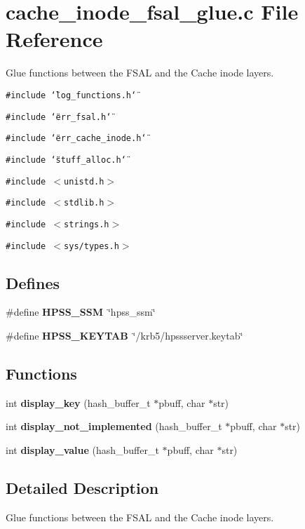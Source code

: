 \section{cache\_\-inode\_\-fsal\_\-glue.c File Reference}
\label{cache__inode__fsal__glue_8c}
Glue functions between the FSAL and the Cache inode layers. 

{\tt \#include \char`\"{}log\_\-functions.h\char`\"{}}\par
{\tt \#include \char`\"{}err\_\-fsal.h\char`\"{}}\par
{\tt \#include \char`\"{}err\_\-cache\_\-inode.h\char`\"{}}\par
{\tt \#include \char`\"{}stuff\_\-alloc.h\char`\"{}}\par
{\tt \#include $<$unistd.h$>$}\par
{\tt \#include $<$stdlib.h$>$}\par
{\tt \#include $<$strings.h$>$}\par
{\tt \#include $<$sys/types.h$>$}\par
\subsection*{Defines}
\begin{CompactItemize}
\item 
\#define {\bf HPSS\_\-SSM}\ \char`\"{}hpss\_\-ssm\char`\"{}
\item 
\#define {\bf HPSS\_\-KEYTAB}\ \char`\"{}/krb5/hpssserver.keytab\char`\"{}
\end{CompactItemize}
\subsection*{Functions}
\begin{CompactItemize}
\item 
int {\bf display\_\-key} (hash\_\-buffer\_\-t $\ast$pbuff, char $\ast$str)
\item 
int {\bf display\_\-not\_\-implemented} (hash\_\-buffer\_\-t $\ast$pbuff, char $\ast$str)
\item 
int {\bf display\_\-value} (hash\_\-buffer\_\-t $\ast$pbuff, char $\ast$str)
\end{CompactItemize}


\subsection{Detailed Description}
Glue functions between the FSAL and the Cache inode layers. 


